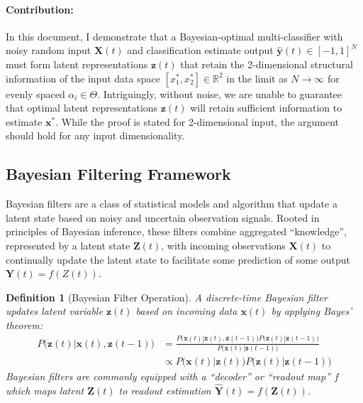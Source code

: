 \documentclass[12pt]{article}
\newtheorem{definition}{Definition}
\begin{document}
\paragraph{Contribution: } In this document, I demonstrate that a
Bayesian-optimal multi-classifier with noisy random input $\mathbf X(t)$ and
classification estimate output $\hat {\mathbf y}(t) \in [-1, 1]^N$ must form
latent representations $\mathbf z(t)$ that retain the 2-dimensional structural
information of the input data space $[x_1^*, x_2^*] \in \mathbb R^2$ in the
limit as $N\to \infty$ for evenly spaced $\alpha_i \in \Theta$. 
Intriguingly, without noise, we are unable to guarantee that optimal latent
representations $\mathbf z(t)$ will retain sufficient information to estimate
$\mathbf x^*$. 
While the proof is stated for 2-dimensional input, the argument should hold for
any input dimensionality. 



\subsection{Bayesian Filtering Framework}

Bayesian filters are a class of statistical models and algorithm that update a
latent state based on noisy and uncertain observation signals. 
Rooted in principles of Bayesian inference, these filters combine aggregated 
``knowledge'', represented by a latent state $\mathbf Z(t)$, with incoming
observations $\mathbf X(t)$ to continually update the latent state to
facilitate some prediction of some output $\mathbf Y(t) = f(Z(t))$. 


\begin{definition}[Bayesian Filter Operation]
	A discrete-time Bayesian filter updates latent variable $\mathbf z(t)$
	based on incoming data $\mathbf x(t)$ by applying Bayes' theorem: 
	\begin{align}
		\label{eqn:bayes_filter}
		P \big(\mathbf z(t) | \mathbf  x(t), \mathbf z(t-1)\big) &= \frac{
			P\big(\mathbf x(t) | \mathbf z(t), \mathbf z(t-1)\big) 
			P\big(\mathbf z(t) | \mathbf z(t-1)\big)
		}{
			P\big(\mathbf x(t) | \mathbf z(t-1)\big)
		} \\
		&\propto P\big(\mathbf x(t) | \mathbf z(t) \big) 
			P\big(\mathbf z(t) | \mathbf z(t-1)\big)
	\end{align}
	Bayesian filters are commonly equipped with a ``decoder'' or ``readout
	map'' $f$ which maps latent $\mathbf Z(t)$ to readout estimation
	$\hat{\mathbf Y}(t) = f(\mathbf Z(t))$.
\end{definition}
\end{document}
